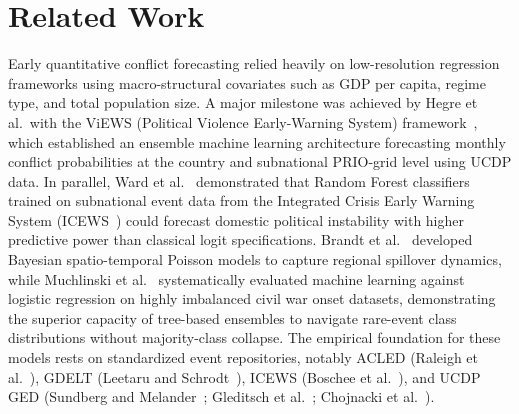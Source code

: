 \documentclass[preprint,12pt]{elsarticle}
\begin{document}
\section{Related Work}
\label{sec:related}

Early quantitative conflict forecasting relied heavily on low-resolution regression frameworks using macro-structural covariates such as GDP per capita, regime type, and total population size. A major milestone was achieved by Hegre et al.\ with the ViEWS (Political Violence Early-Warning System) framework~\cite{hegre2019views, hegre2018forecasting, hegre2019predicting}, which established an ensemble machine learning architecture forecasting monthly conflict probabilities at the country and subnational PRIO-grid level using UCDP data. In parallel, Ward et al.~\cite{ward2013predicting} demonstrated that Random Forest classifiers trained on subnational event data from the Integrated Crisis Early Warning System (ICEWS~\cite{boschee2015icews}) could forecast domestic political instability with higher predictive power than classical logit specifications. Brandt et al.~\cite{brandt2016forecasting} developed Bayesian spatio-temporal Poisson models to capture regional spillover dynamics, while Muchlinski et al.~\cite{muchlinski2016comparing} systematically evaluated machine learning against logistic regression on highly imbalanced civil war onset datasets, demonstrating the superior capacity of tree-based ensembles to navigate rare-event class distributions without majority-class collapse. The empirical foundation for these models rests on standardized event repositories, notably ACLED (Raleigh et al.~\cite{raleigh2010introducing}), GDELT (Leetaru and Schrodt~\cite{leetaru2013gdelt}), ICEWS (Boschee et al.~\cite{boschee2015icews}), and UCDP GED (Sundberg and Melander~\cite{sundberg2013introducing}; Gleditsch et al.~\cite{gleditsch2002armed}; Chojnacki et al.~\cite{chojnacki2012event}).
\end{document}
